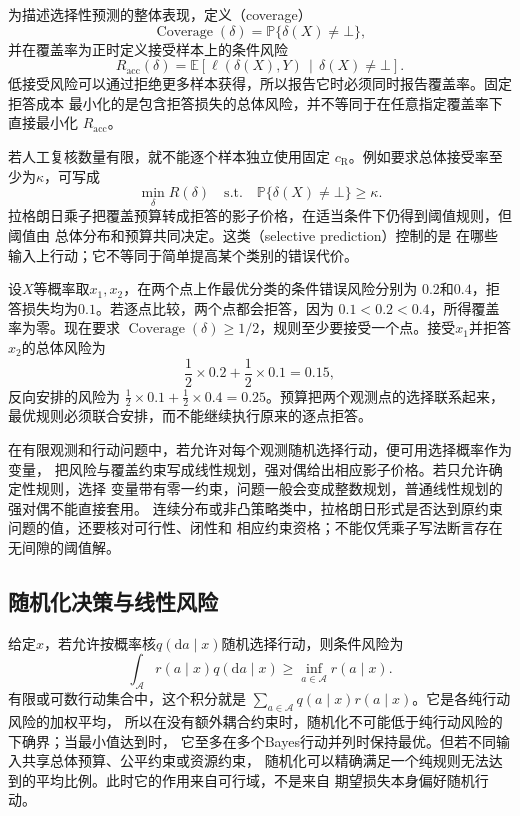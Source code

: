 为描述选择性预测的整体表现，定义（coverage）
\[
  \operatorname{Coverage}(\delta)
  =
  \mathbb{P}\{\delta(X)\neq\bot\},
\]
并在覆盖率为正时定义接受样本上的条件风险
\[
  R_{\mathrm{acc}}(\delta)
  =
  \mathbb{E}\left[
    \ell(\delta(X),Y)
    \,\middle|\,
    \delta(X)\neq\bot
  \right].
\]
低接受风险可以通过拒绝更多样本获得，所以报告它时必须同时报告覆盖率。固定拒答成本
最小化的是包含拒答损失的总体风险，并不等同于在任意指定覆盖率下直接最小化
\(R_{\mathrm{acc}}\)。

若人工复核数量有限，就不能逐个样本独立使用固定
\(c_{\mathrm{R}}\)。例如要求总体接受率至少为\(\kappa\)，可写成
\[
  \min_{\delta}R(\delta)
  \quad\text{s.t.}\quad
  \mathbb{P}\{\delta(X)\neq\bot\}\geq\kappa.
\]
拉格朗日乘子把覆盖预算转成拒答的影子价格，在适当条件下仍得到阈值规则，但阈值由
总体分布和预算共同决定。这类（selective prediction）控制的是
在哪些输入上行动；它不等同于简单提高某个类别的错误代价。

\begin{example}[覆盖预算耦合两个观测点]
\label{ex:decision-two-point-coverage-budget}
设\(X\)等概率取\(x_1,x_2\)，在两个点上作最优分类的条件错误风险分别为
\(0.2\)和\(0.4\)，拒答损失均为\(0.1\)。若逐点比较，两个点都会拒答，因为
\(0.1<0.2<0.4\)，所得覆盖率为零。现在要求
\(\operatorname{Coverage}(\delta)\geq1/2\)，规则至少要接受一个点。接受\(x_1\)并拒答
\(x_2\)的总体风险为
\[
  \frac12\times0.2+\frac12\times0.1=0.15,
\]
反向安排的风险为
\(\frac12\times0.1+\frac12\times0.4=0.25\)。预算把两个观测点的选择联系起来，
最优规则必须联合安排，而不能继续执行原来的逐点拒答。
\end{example}

在有限观测和行动问题中，若允许对每个观测随机选择行动，便可用选择概率作为变量，
把风险与覆盖约束写成线性规划，强对偶给出相应影子价格。若只允许确定性规则，选择
变量带有零一约束，问题一般会变成整数规划，普通线性规划的强对偶不能直接套用。
连续分布或非凸策略类中，拉格朗日形式是否达到原约束问题的值，还要核对可行性、闭性和
相应约束资格；不能仅凭乘子写法断言存在无间隙的阈值解。

\subsection{随机化决策与线性风险}
给定\(x\)，若允许按概率核\(q(\mathrm{d}a\mid x)\)随机选择行动，则条件风险为
\[
  \int_{\mathcal{A}}r(a\mid x)q(\mathrm{d}a\mid x)
  \geq
  \inf_{a\in\mathcal{A}}r(a\mid x).
\]
有限或可数行动集合中，这个积分就是
\(\sum_{a\in\mathcal{A}}q(a\mid x)r(a\mid x)\)。它是各纯行动风险的加权平均，
所以在没有额外耦合约束时，随机化不可能低于纯行动风险的下确界；当最小值达到时，
它至多在多个Bayes行动并列时保持最优。但若不同输入共享总体预算、公平约束或资源约束，
随机化可以精确满足一个纯规则无法达到的平均比例。此时它的作用来自可行域，不是来自
期望损失本身偏好随机行动。

